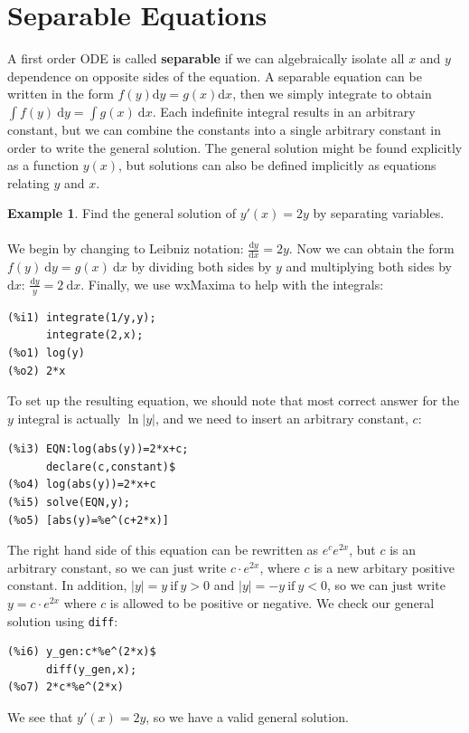 \documentclass[10.5pt,twoside]{report}
\theoremstyle{definition}
\newtheorem{exmp}{Example}[section]
\begin{document}
\section{Separable Equations}\label{Separable Equations}

A first order ODE is called \textbf{separable} if we can algebraically isolate all $x$ and $y$ dependence on opposite sides of the equation.   A separable equation can be written in the form $f(y)\mathrm{d}y =g(x) \mathrm{d}x$, then we simply integrate to obtain $\displaystyle \int f(y)\ \mathrm{d}y = \displaystyle \int g(x)\ \mathrm{d}x$.  Each indefinite integral results in an arbitrary constant, but we can combine the constants into a single arbitrary constant in order to write the general solution.  The general solution might be found explicitly as a function $y(x)$, but solutions can also be defined implicitly as equations relating $y$ and $x$.


\begin{exmp} Find the general solution of $y'(x)=2y$ by separating variables.\\
${}$\\

We begin by changing to Leibniz notation:  $\displaystyle \frac{\mathrm{d}y}{\mathrm{d}x}=2y$.  Now we can obtain the form $f(y)\ \mathrm{d}y=g(x)\ \mathrm{d}x$ by dividing both sides by $y$ and multiplying both sides by $\mathrm{d}x$:  $\displaystyle \frac{\mathrm{d}y}{y}=2\ \mathrm{d}x$.  Finally, we use wxMaxima to help with the integrals:

\begin{verbatim}
(%i1) integrate(1/y,y);
      integrate(2,x);
(%o1) log(y)
(%o2) 2*x
\end{verbatim}

To set up the resulting equation, we should note that most correct answer for the $y$ integral is actually $\ln{|y|}$, and we need to insert an arbitrary constant, $c$:

\begin{verbatim}
(%i3) EQN:log(abs(y))=2*x+c;
      declare(c,constant)$
(%o4) log(abs(y))=2*x+c
(%i5) solve(EQN,y);
(%o5) [abs(y)=%e^(c+2*x)]
\end{verbatim}

The right hand side of this equation can be rewritten as $e^c e^{2x}$, but $c$ is an arbitrary constant, so we can just write $c\cdot e^{2x}$, where $c$ is a new arbitary positive constant.  In addition, $|y|=y\ \mathrm{ if }\ y>0$ and $|y|=-y\ \mathrm{ if }\ y<0$, so we can just write $y=c\cdot e^{2x}$ where $c$ is allowed to be positive or negative.  We check our general solution using \verb|diff|:

\begin{verbatim}
(%i6) y_gen:c*%e^(2*x)$
      diff(y_gen,x);
(%o7) 2*c*%e^(2*x)
\end{verbatim}

We see that $y'(x)=2y$, so we have a valid general solution.

\end{exmp}
\end{document}
